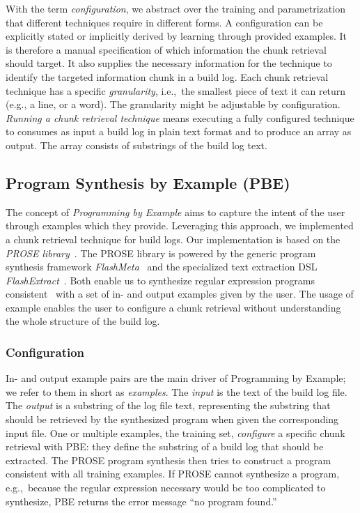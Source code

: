 With the term \textit{configuration}, we abstract over the training
and parametrization that different techniques require in different
forms.
A configuration can be explicitly stated or implicitly derived
by learning through provided examples.
It is therefore a manual
specification of which information the chunk retrieval should target.
It also supplies the necessary information for the technique to
identify the targeted information chunk in a build log.
Each chunk
retrieval technique has a specific \textit{granularity}, i.e.,\ the
smallest piece of text it can return (e.g., a line, or a word).
The
granularity might be adjustable by configuration.
\emph{Running a
chunk retrieval technique} means executing a fully configured
technique to consumes as input a build log in plain text format and to
produce an array as output.
The array consists of substrings of the
build log text.

\subsection{Program Synthesis by Example (PBE)}
The concept of \emph{Programming by Example} aims to capture the
intent of the user through examples which they provide.
Leveraging this approach, we implemented a chunk retrieval technique
for build logs.
Our implementation is based on the
\emph{PROSE library}~\cite{prose2019webpage}.
The PROSE library is powered by the generic program synthesis framework
\emph{FlashMeta}~\cite{polozov2015flashmeta:} and the specialized
text extraction DSL \emph{FlashExtract}~\cite{le2014flashextract:}.
Both enable us to synthesize regular expression programs
consistent~\cite{mitchell1982generalization} with a set of in-
and output examples given by the user.
The usage of example enables the user to configure a chunk
retrieval without understanding the whole structure of
the build log.

\subsubsection{Configuration}
In- and output example pairs are the main driver of Programming by
Example; we refer to them in short as \emph{examples}.
The \emph{input} is the text of the build log file.
The \emph{output} is
a substring of the log file text, representing the
substring that should be retrieved by the synthesized program when
given the corresponding input file.
One or multiple examples, the
training set, \emph{configure} a specific chunk retrieval with PBE:
they define the substring of a build log that should be extracted.
The PROSE program synthesis then tries to construct a program
consistent with all training examples.
If PROSE cannot synthesize a program, e.g.,\
because the regular expression
necessary would be too complicated to synthesize, PBE returns the
error message ``no program found.''

